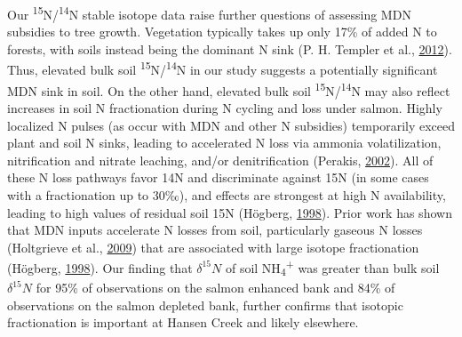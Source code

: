 \documentclass [11pt, proquest] {uwthesis}[2015/03/03]
\begin{document}
Our \textsuperscript{15}N/\textsuperscript{14}N stable isotope data
raise further questions of assessing MDN subsidies to tree growth.
Vegetation typically takes up only 17\% of added N to forests, with
soils instead being the dominant N sink (P. H. Templer et al.,
\protect\hyperlink{ref-Templer2012}{2012}). Thus, elevated bulk soil
\textsuperscript{15}N/\textsuperscript{14}N in our study suggests a
potentially significant MDN sink in soil. On the other hand, elevated
bulk soil \textsuperscript{15}N/\textsuperscript{14}N may also reflect
increases in soil N fractionation during N cycling and loss under
salmon. Highly localized N pulses (as occur with MDN and other N
subsidies) temporarily exceed plant and soil N sinks, leading to
accelerated N loss via ammonia volatilization, nitrification and nitrate
leaching, and/or denitrification (Perakis,
\protect\hyperlink{ref-Perakis2002}{2002}). All of these N loss pathways
favor 14N and discriminate against 15N (in some cases with a
fractionation up to 30‰), and effects are strongest at high N
availability, leading to high values of residual soil 15N (Högberg,
\protect\hyperlink{ref-Hogberg1998}{1998}). Prior work has shown that
MDN inputs accelerate N losses from soil, particularly gaseous N losses
(Holtgrieve et al., \protect\hyperlink{ref-Holtgrieve2009}{2009}) that
are associated with large isotope fractionation (Högberg,
\protect\hyperlink{ref-Hogberg1998}{1998}). Our finding that
\(\delta^{15}N\) of soil NH\textsubscript{4}\textsuperscript{+} was
greater than bulk soil \(\delta^{15}N\) for 95\% of observations on the
salmon enhanced bank and 84\% of observations on the salmon depleted
bank, further confirms that isotopic fractionation is important at
Hansen Creek and likely elsewhere.
\end{document}
